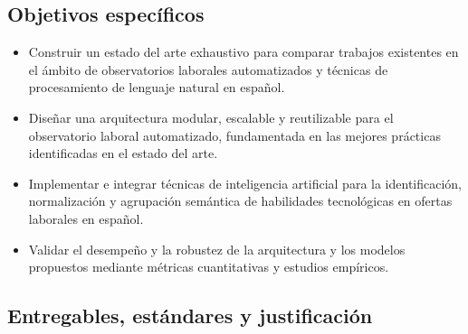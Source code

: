 \subsection{Objetivos específicos}

\begin{itemize}
    \item Construir un estado del arte exhaustivo para comparar trabajos existentes en el ámbito de observatorios laborales automatizados y técnicas de procesamiento de lenguaje natural en español.

    \item Diseñar una arquitectura modular, escalable y reutilizable para el observatorio laboral automatizado, fundamentada en las mejores prácticas identificadas en el estado del arte.

    \item Implementar e integrar técnicas de inteligencia artificial para la identificación, normalización y agrupación semántica de habilidades tecnológicas en ofertas laborales en español.

    \item Validar el desempeño y la robustez de la arquitectura y los modelos propuestos mediante métricas cuantitativas y estudios empíricos.
\end{itemize}

\subsection{Entregables, estándares y justificación}

